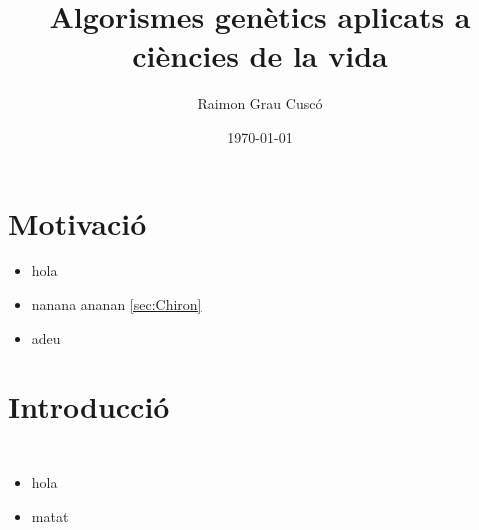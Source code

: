 \documentclass{beamer}
\begin{document}
\title{Algorismes genètics aplicats a ciències de la vida}
\author{Raimon Grau Cuscó}
\date{\today}


\frame{\titlepage} 


\section{Motivació} %
\label{sec:Motivacio}
\begin{itemize}
	\item hola
	\item nanana ananan \ref{sec:Chiron}
	\item adeu
\end{itemize}


\section{Introducció} %

\begin{frame}
	\begin{columns}[c]
		\begin{itemize}
			\item hola
				\pause
			\item matat
		\end{itemize}
	\end{columns}
\end{frame}
\end{document}
